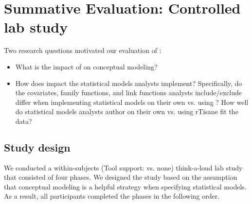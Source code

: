 \section{Summative Evaluation: Controlled lab study} \label{sec:summativeEval}

Two research questions motivated our evaluation of \rTisane:

\begin{itemize}
    \item \evalConceptualModels What is the impact of \rTisane on conceptual
    modeling?
    \item \evalStatisticalModels How does \rTisane impact the statistical models
    analysts implement? Specifically, do the covariates, family functions, and
    link functions analysts include/exclude differ when implementing statistical
    models on their own vs. using \rTisane? How well do statistical models
    analysts author on their own vs. using rTisane fit the data? 
\end{itemize}

\subsection{Study design}
We conducted a within-subjects (Tool support: \rTisane vs. none) think-a-loud
lab study that consisted of four phases. We designed the study based on the
assumption that conceptual modeling is a helpful strategy when specifying
statistical models. As a result, all participants completed the phases in the
following order.

